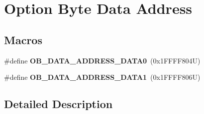 \hypertarget{group___f_l_a_s_h_ex___o_b___data___address}{}\section{Option Byte Data Address}
\label{group___f_l_a_s_h_ex___o_b___data___address}
\subsection*{Macros}
\begin{DoxyCompactItemize}
\item 
\mbox{\label{group___f_l_a_s_h_ex___o_b___data___address_gab29881e9575bfff3504b84afa20cafbe}} 
\#define {\bfseries O\+B\+\_\+\+D\+A\+T\+A\+\_\+\+A\+D\+D\+R\+E\+S\+S\+\_\+\+D\+A\+T\+A0}~(0x1\+F\+F\+F\+F804\+U)
\item 
\mbox{\label{group___f_l_a_s_h_ex___o_b___data___address_ga33cb1b378fd742c722f5bdce21c65b0e}} 
\#define {\bfseries O\+B\+\_\+\+D\+A\+T\+A\+\_\+\+A\+D\+D\+R\+E\+S\+S\+\_\+\+D\+A\+T\+A1}~(0x1\+F\+F\+F\+F806\+U)
\end{DoxyCompactItemize}


\subsection{Detailed Description}
